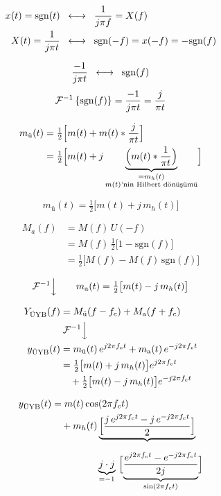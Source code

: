 \documentclass[11pt,a4paper]{article}
\begin{document}
\begin{align*}
x(t) = \mathrm{sgn}(t) &\;\;\longleftrightarrow\;\; \frac{1}{j\pi f} = X(f)\\
X(t) = \frac{1}{j\pi t} &\;\;\longleftrightarrow\;\; \mathrm{sgn}(-f) = x(-f) = -\mathrm{sgn}(f)
\end{align*}

\[ \frac{-1}{j\pi t} \;\;\longleftrightarrow\;\; \mathrm{sgn}(f) \]
\[ \mathcal{F}^{-1}\left\{\mathrm{sgn}(f)\right\} = \frac{-1}{j\pi t} = \frac{j}{\pi t} \]

\begin{align*}
m_{\text{ü}}(t) &= \tfrac12\Bigl[m(t) + m(t)\ast\frac{j}{\pi t}\Bigr]\\
&= \tfrac12\Bigl[m(t) + j\underbrace{\Bigl(m(t)\ast\frac{1}{\pi t}\Bigr)}_{\substack{=m_h(t)\\ \text{$m(t)$'nin Hilbert dönüşümü}}}\Bigr]
\end{align*}

\[ m_{\text{ü}}(t) = \tfrac12\bigl[m(t) + j\,m_h(t)\bigr] \]

\begin{align*}
M_a(f) &= M(f)\,U(-f)\\
&= M(f)\,\tfrac12\bigl[1-\mathrm{sgn}(f)\bigr]\\
&= \tfrac12\bigl[M(f) - M(f)\,\mathrm{sgn}(f)\bigr]
\end{align*}

\[ \mathcal{F}^{-1}\Big\downarrow \qquad m_{\text{a}}(t) = \tfrac12\bigl[m(t)-j\,m_h(t)\bigr] \]

\begin{align*}
Y_{\text{ÜYB}}(f) &= M_{\text{ü}}(f-f_c) + M_{\text{a}}(f+f_c)\\
&\;\mathcal{F}^{-1}\Big\downarrow\\
y_{\text{ÜYB}}(t) &= m_{\text{ü}}(t)\,e^{j2\pi f_c t} + m_{\text{a}}(t)\,e^{-j2\pi f_c t}\\
&= \tfrac12\bigl[m(t)+j\,m_h(t)\bigr]e^{j2\pi f_c t}\\
&\quad + \tfrac12\bigl[m(t)-j\,m_h(t)\bigr]e^{-j2\pi f_c t}
\end{align*}

\begin{align*}
y_{\text{ÜYB}}(t) &= m(t)\cos(2\pi f_c t)\\
&\quad + m_h(t)\underbrace{\Bigl[\frac{j\,e^{j2\pi f_c t} - j\,e^{-j2\pi f_c t}}{2}\Bigr]}_{\ }\\
&\qquad\qquad\ \ \underbrace{j\cdot j}_{=-1}\ \Bigl[\underbrace{\frac{e^{j2\pi f_c t}-e^{-j2\pi f_c t}}{2j}}_{\sin(2\pi f_c t)}\Bigr]
\end{align*}
\end{document}
